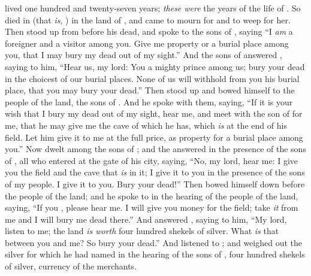 
\bverse \Sarah lived one hundred and twenty-seven years; \textit{these were} the years of the life of \Sarah.
\bverse So \Sarah died in  (that \textit{is}, ) in the land of \Canaan, and \Abraham came to mourn for \Sarah and to weep for her.
\bverse Then \Abraham stood up from before his dead, and spoke to the sons of , saying
\bverse ``I \textit{am} a foreigner and a visitor among you. Give me property or a burial place among you, that I may bury my dead out of my sight.''
\bverse And the sons of  answered \Abraham, saying to him, 
\bverse ``Hear us, my lord: You \are a mighty prince among us; bury your dead in the choicest of our burial places. None of us will withhold from you his burial place, that you may bury your dead.''
\bverse Then \Abraham stood up and bowed himself to the people of the land, the sons of .
\bverse And he spoke with them, saying, ``If it is your wish that I bury my dead out of my sight, hear me, and meet with  the son of  for me,
\bverse that he may give me the cave of  which he has, which \textit{is} at the end of his field. Let him give it to me at the full price, as property for a burial place among you.''
\bverse Now  dwelt among the sons of ; and  the  answered \Abraham in the presence of the sons of , all who entered at the gate of his city, saying,
\bverse ``No, my lord, hear me: I give you the field and the cave that \textit{is} in it; I give it to you in the presence of the sons of my people. I give it to you. Bury your dead!''
\bverse Then \Abraham bowed himself down before the people of the land;
\bverse and he spoke to  in the hearing of the people of the land, saying, ``If you , please hear me. I will give you money for the field; take \textit{it} from me and I will bury me dead there.''
\bverse And  answered \Abraham, saying to him,
\bverse ``My lord, listen to me; the land \textit{is worth} four hundred shekels of silver. What \textit{is} that between you and me? So bury your dead.''
\bverse And \Abraham listened to ; and \Abraham weighed out the silver for  which he had named in the hearing of the sons of , four hundred shekels of silver, currency of the merchants.
